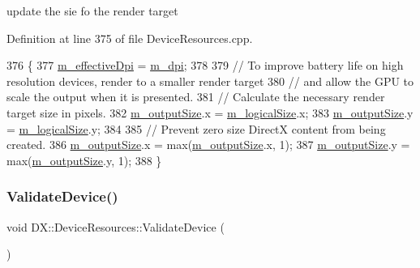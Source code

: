 update the sie fo the render target 



Definition at line 375 of file Device\+Resources.\+cpp.


\begin{DoxyCode}
376 \{
377     \mbox{\hyperlink{class_d_x_1_1_device_resources_a0999b5522ac0a401e92b18db8f12a663}{m\_effectiveDpi}} = \mbox{\hyperlink{class_d_x_1_1_device_resources_a1d146efc89ae892dbcd78045d493ff2a}{m\_dpi}};
378 
379     \textcolor{comment}{// To improve battery life on high resolution devices, render to a smaller render target}
380     \textcolor{comment}{// and allow the GPU to scale the output when it is presented.}
381     \textcolor{comment}{// Calculate the necessary render target size in pixels.}
382     \mbox{\hyperlink{class_d_x_1_1_device_resources_aa102e231efe8bb03f3a91728f8477d08}{m\_outputSize}}.x = \mbox{\hyperlink{class_d_x_1_1_device_resources_a4689509084ecb52b9edf0f6e4ed886d9}{m\_logicalSize}}.x;
383         \mbox{\hyperlink{class_d_x_1_1_device_resources_aa102e231efe8bb03f3a91728f8477d08}{m\_outputSize}}.y = \mbox{\hyperlink{class_d_x_1_1_device_resources_a4689509084ecb52b9edf0f6e4ed886d9}{m\_logicalSize}}.y;
384 
385     \textcolor{comment}{// Prevent zero size DirectX content from being created.}
386     \mbox{\hyperlink{class_d_x_1_1_device_resources_aa102e231efe8bb03f3a91728f8477d08}{m\_outputSize}}.x = max(\mbox{\hyperlink{class_d_x_1_1_device_resources_aa102e231efe8bb03f3a91728f8477d08}{m\_outputSize}}.x, 1);
387     \mbox{\hyperlink{class_d_x_1_1_device_resources_aa102e231efe8bb03f3a91728f8477d08}{m\_outputSize}}.y = max(\mbox{\hyperlink{class_d_x_1_1_device_resources_aa102e231efe8bb03f3a91728f8477d08}{m\_outputSize}}.y, 1);
388 \}
\end{DoxyCode}
\mbox{\label{class_d_x_1_1_device_resources_ab6976bc6f653fab6899b53a4b5308b06}} 
\subsubsection{\texorpdfstring{Validate\+Device()}{ValidateDevice()}}
{\footnotesize\ttfamily void D\+X\+::\+Device\+Resources\+::\+Validate\+Device (\begin{DoxyParamCaption}{ }\end{DoxyParamCaption})}



